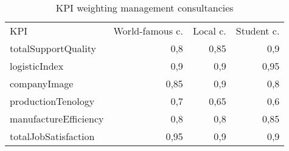 \begin{table}[ht]
\centering
\begin{tabular}{|l|r|r|r|}
\hline
KPI                     & World-famous c.   & Local c.   & Student c.\\
totalSupportQuality     & 0,8               & 0,85       & 0,9       \\
logisticIndex           & 0,9               & 0,9        & 0,95      \\
companyImage            & 0,85              & 0,9        & 0,8       \\
productionTenology      & 0,7               & 0,65       & 0,6       \\
manufactureEfficiency   & 0,8               & 0,8        & 0,85      \\
totalJobSatisfaction    & 0,95              & 0,9        & 0,9       \\
\hline
\end{tabular}
\caption{KPI weighting management consultancies}
\label{mngc_weighting}
\end{table}

